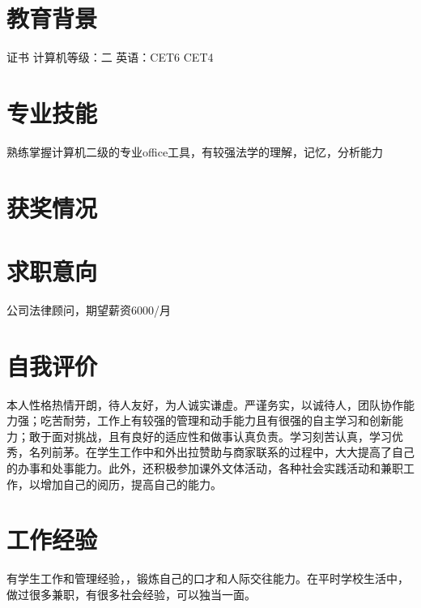 \documentclass{uniquecv}
\begin{document}

\medskip



\section{教育背景}
证书 \quad 计算机等级：二 \quad 英语：CET6 CET4



\section{专业技能}
\smallskip
熟练掌握计算机二级的专业office工具，有较强法学的理解，记忆，分析能力


\section{获奖情况}
\medskip

\section{求职意向}
公司法律顾问，期望薪资6000/月
\section{自我评价}
本人性格热情开朗，待人友好，为人诚实谦虚。严谨务实，以诚待人，团队协作能力强；吃苦耐劳，工作上有较强的管理和动手能力且有很强的自主学习和创新能力；敢于面对挑战，且有良好的适应性和做事认真负责。学习刻苦认真，学习优秀，名列前茅。在学生工作中和外出拉赞助与商家联系的过程中，大大提高了自己的办事和处事能力。此外，还积极参加课外文体活动，各种社会实践活动和兼职工作，以增加自己的阅历，提高自己的能力。
\section{工作经验}
有学生工作和管理经验，，锻炼自己的口才和人际交往能力。在平时学校生活中，做过很多兼职，有很多社会经验，可以独当一面。
\end{document}
